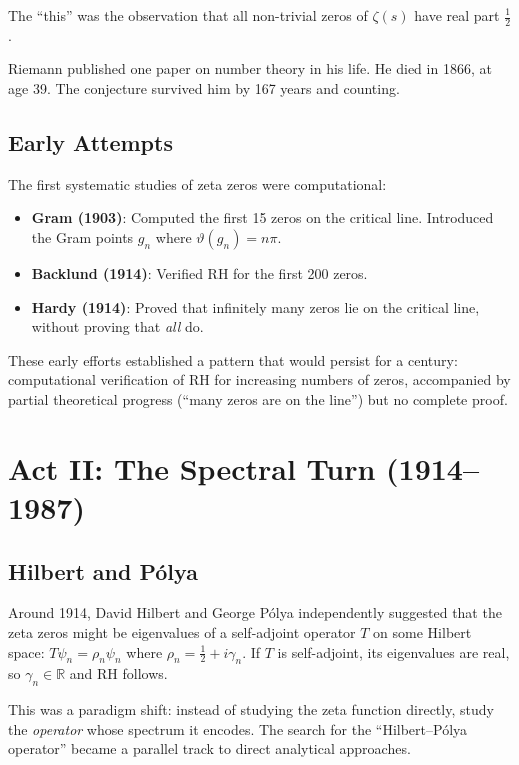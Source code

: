\documentclass[11pt,a4paper]{article}
\begin{document}
The ``this'' was the observation that all non-trivial zeros of
$\zeta(s)$ have real part $\frac{1}{2}$.

Riemann published one paper on number theory in his life. He died
in 1866, at age 39. The conjecture survived him by 167 years
and counting.

\subsection{Early Attempts}

The first systematic studies of zeta zeros were computational:

\begin{itemize}
  \item \textbf{Gram (1903)}: Computed the first 15 zeros on the
    critical line. Introduced the Gram points $g_n$ where
    $\vartheta(g_n) = n\pi$.
  \item \textbf{Backlund (1914)}: Verified RH for the first 200
    zeros.
  \item \textbf{Hardy (1914)}: Proved that infinitely many zeros
    lie on the critical line, without proving that \emph{all} do.
\end{itemize}

These early efforts established a pattern that would persist for
a century: computational verification of RH for increasing numbers
of zeros, accompanied by partial theoretical progress (``many zeros
are on the line'') but no complete proof.

\section{Act II: The Spectral Turn (1914--1987)}

\subsection{Hilbert and P\'olya}

Around 1914, David Hilbert and George P\'olya independently
suggested that the zeta zeros might be eigenvalues of a
self-adjoint operator $T$ on some Hilbert space: $T\psi_n =
\rho_n \psi_n$ where $\rho_n = \frac{1}{2} + i\gamma_n$. If $T$
is self-adjoint, its eigenvalues are real, so $\gamma_n \in \mathbb{R}$
and RH follows.

This was a paradigm shift: instead of studying the zeta function
directly, study the \emph{operator} whose spectrum it encodes.
The search for the ``Hilbert--P\'olya operator'' became a
parallel track to direct analytical approaches.
\end{document}
